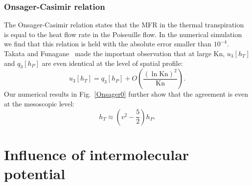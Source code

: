\subsubsection{Onsager-Casimir relation}


The Onsager-Casimir relation states that the MFR in the thermal transpiration is equal to the heat flow rate in the Poiseuille flow. In the numerical simulation we find that this relation is held with the absolute error smaller than $10^{-4}$. Takata and Funagane~\cite{Takata2011} made the important observation that at large $\text{Kn}$, $u_3[h_T]$ and $q_3[h_P]$ are even identical at the level of spatial profile:
\begin{equation}
u_3[h_T]=q_3[h_P]+O\left(\frac{(\ln{\text{Kn}})^2}{\text{Kn}}\right).
\end{equation}
Our numerical results in Fig.~\ref{Onsager0} further show that the agreement is even at the mesoscopic level:
\begin{equation}
h_T\approx\left({v}^2-\frac{5}{2}\right)h_P.
\end{equation} 

%



\section{Influence of intermolecular potential}

